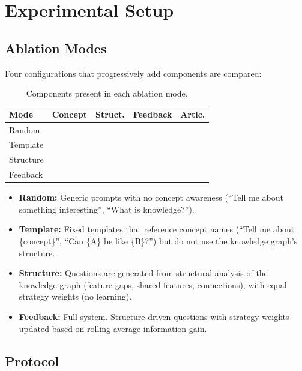 \documentclass[conference]{IEEEtran}
\newcommand{\cmark}{\ding{51}}
\newcommand{\xmark}{\ding{55}}
\begin{document}
\section{Experimental Setup}
\label{sec:setup}

\subsection{Ablation Modes}

Four configurations that progressively add components are compared:

\begin{table}[H]
\centering
\caption{Components present in each ablation mode.}
\small
\begin{tabular}{lcccc}
\toprule
\textbf{Mode} & \textbf{Concept} & \textbf{Struct.} & \textbf{Feedback} & \textbf{Artic.} \\
\midrule
Random    & \xmark & \xmark & \xmark & \xmark \\
Template  & \cmark & \xmark & \xmark & \xmark \\
Structure & \cmark & \cmark & \xmark & \cmark \\
Feedback  & \cmark & \cmark & \cmark & \cmark \\
\bottomrule
\end{tabular}
\label{tab:modes}
\end{table}

\FloatBarrier

\begin{itemize}[leftmargin=*]
\item \textbf{Random:} Generic prompts with no concept awareness (``Tell me about something interesting'', ``What is knowledge?'').
\item \textbf{Template:} Fixed templates that reference concept names (``Tell me about \{concept\}'', ``Can \{A\} be like \{B\}?'') but do not use the knowledge graph's structure.
\item \textbf{Structure:} Questions are generated from structural analysis of the knowledge graph (feature gaps, shared features, connections), with equal strategy weights (no learning).
\item \textbf{Feedback:} Full system. Structure-driven questions with strategy weights updated based on rolling average information gain.
\end{itemize}

\subsection{Protocol}
\end{document}
